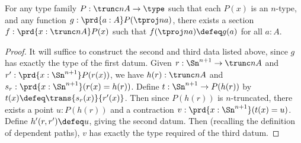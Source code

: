 %
\begin{thm}\label{thm:truncn-ind}
  For any type family $P:\trunc n A \to \type$ such that each $P(x)$ is an $n$-type, and any function $g : \prd{a:A} P(\tproj n a)$, there
exists a section $f:\prd{x:\trunc n A} P(x)$ such that $f(\tproj n a)\defeq g(a)$ for all $a:A$.
\end{thm}

\begin{proof}
  It will suffice to construct the second and third data listed above, since $g$ has exactly the type of the first datum.
  Given $r:\Sn^{n+1} \to \trunc n A$ and $r':\prd{x:\Sn^{n+1}} P(r(x))$, we have $h(r):\trunc n A$ and $s_r :\prd{x:\Sn^{n+1}} (r(x) =
h(r))$.
  Define $t:\Sn^{n+1} \to P(h(r))$ by $t(x) \defeq \trans{s_r(x)}{r'(x)}$.
  Then since $P(h(r))$ is $n$-truncated, there exists a point $u:P(h(r))$ and a contraction $v:\prd{x:\Sn^{n+1}} (t(x) = u)$.
  Define $h'(r,r') \defeq u$, giving the second datum.
  Then (recalling the definition of dependent paths), $v$ has exactly the type required of the third datum.
\end{proof}
